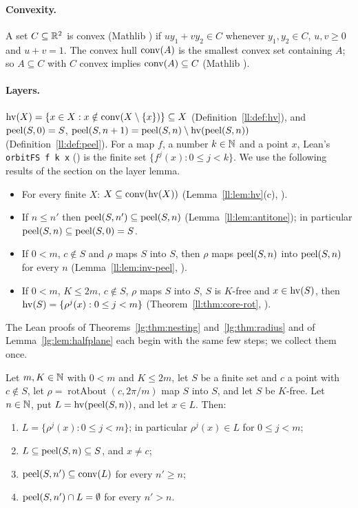 \paragraph{Convexity.} A set $C\subseteq\mathbb R^2$ is convex (Mathlib ) if $uy_1+vy_2\in C$ whenever
$y_1,y_2\in C$, $u,v\ge0$ and $u+v=1$. The convex hull $\operatorname{conv}(A)$ is the smallest convex set containing $A$; so
$A\subseteq C$ with $C$ convex implies $\operatorname{conv}(A)\subseteq C$ (Mathlib ).

\paragraph{Layers.} $\operatorname{hv}(X)=\{x\in X: x\notin\operatorname{conv}(X\setminus\{x\})\}\subseteq X$ (Definition~\ref{ll:def:hv}), and
$\operatorname{peel}(S,0)=S$, $\operatorname{peel}(S,n+1)=\operatorname{peel}(S,n)\setminus\operatorname{hv}(\operatorname{peel}(S,n))$ (Definition~\ref{ll:def:peel}). For a map $f$, a
number $k\in\mathbb N$ and a point $x$, Lean's \texttt{orbitFS f k x} () is the finite set
$\{f^{j}(x):0\le j<k\}$. We use the following results of the section on the layer lemma.
\begin{itemize}
\item[(L1)] For every finite $X$: $X\subseteq\operatorname{conv}(\operatorname{hv}(X))$ (Lemma~\ref{ll:lem:hv}(c), ).
\item[(L2)] If $n\le n'$ then $\operatorname{peel}(S,n')\subseteq\operatorname{peel}(S,n)$ (Lemma~\ref{ll:lem:antitone}); in particular
  $\operatorname{peel}(S,n)\subseteq\operatorname{peel}(S,0)=S$.
\item[(L3)] If $0<m$, $c\notin S$ and $\rho$ maps $S$ into $S$, then $\rho$ maps $\operatorname{peel}(S,n)$ into $\operatorname{peel}(S,n)$ for every
  $n$ (Lemma~\ref{ll:lem:inv-peel}, ).
\item[(L4)] If $0<m$, $K\le 2m$, $c\notin S$, $\rho$ maps $S$ into $S$, $S$ is $K$-free and $x\in\operatorname{hv}(S)$, then
  $\operatorname{hv}(S)=\{\rho^{j}(x):0\le j<m\}$ (Theorem~\ref{ll:thm:core-rot}, ).
\end{itemize}

The Lean proofs of Theorems~\ref{lg:thm:nesting} and~\ref{lg:thm:radius} and of Lemma~\ref{lg:lem:halfplane} each
begin with the same few steps; we collect them once.

\begin{lemma}\label{lg:lem:layer}
Let $m,K\in\mathbb N$ with $0<m$ and $K\le 2m$, let $S$ be a finite set and $c$ a point with $c\notin S$, let
$\rho=\operatorname{rotAbout}(c,2\pi/m)$ map $S$ into $S$, and let $S$ be $K$-free. Let $n\in\mathbb N$, put
$L=\operatorname{hv}(\operatorname{peel}(S,n))$, and let $x\in L$. Then:
\begin{enumerate}[label=(\alph*)]
\item $L=\{\rho^{j}(x):0\le j<m\}$; in particular $\rho^{j}(x)\in L$ for $0\le j<m$;
\item $L\subseteq\operatorname{peel}(S,n)\subseteq S$, and $x\neq c$;
\item $\operatorname{peel}(S,n')\subseteq\operatorname{conv}(L)$ for every $n'\ge n$;
\item $\operatorname{peel}(S,n')\cap L=\emptyset$ for every $n'>n$.
\end{enumerate}
\end{lemma}

